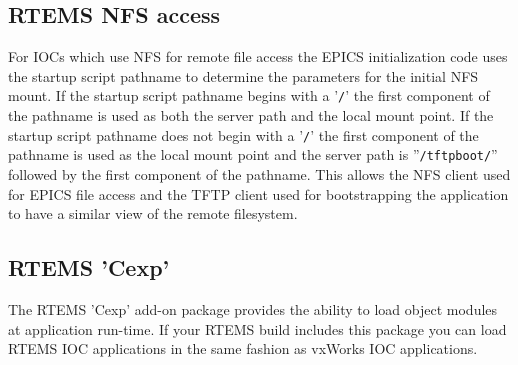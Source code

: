 \subsection{RTEMS NFS access}

For IOCs which use NFS for remote file access the EPICS initialization code uses the startup script pathname to 
determine the parameters for the initial NFS mount.  If the startup script pathname begins with a '\verb|/|' the first component 
of the pathname is used as both the server path and the local mount point. If the startup script pathname does not begin 
with a '\verb|/|' the first component of the pathname is used as the local mount point and the server path is ''\verb|/tftpboot/|'' 
followed by the first component of the pathname.  This allows the NFS client used for EPICS file access and the TFTP 
client used for bootstrapping the application to have a similar view of the remote filesystem.

\subsection{RTEMS 'Cexp'}

The RTEMS 'Cexp' add-on package provides the ability to load object modules at application run-time.  If your RTEMS 
build includes this package you can load RTEMS IOC applications in the same fashion as vxWorks IOC applications.




